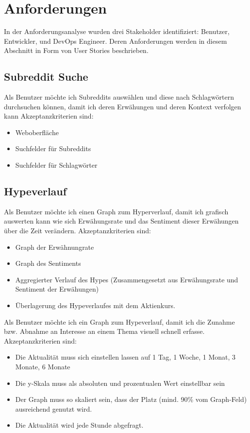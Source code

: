 \documentclass[a4paper, 10pt, conference]{ieeeconf}
\begin{document}
\section{Anforderungen} \label{s:anforderungen}

In der Anforderungsanalyse wurden drei Stakeholder identifiziert: Benutzer, Entwickler, und DevOps Engineer.  Deren Anforderungen werden in diesem Abschnitt in Form von User Stories beschrieben.

\subsection{Subreddit Suche}

Als Benutzer möchte ich Subreddits auswählen und diese nach Schlagwörtern durchsuchen können,  damit ich deren Erwähungen und deren Kontext verfolgen kann  Akzeptanzkriterien sind:
\begin{itemize}
\item Weboberfläche 
\item Suchfelder für Subreddits
\item Suchfelder für Schlagwörter
\end{itemize}

\subsection{Hypeverlauf}

Als Benutzer möchte ich einen Graph zum Hyperverlauf,  damit ich grafisch auswerten kann wie sich Erwähungsrate und das Sentiment dieser Erwähungen über die Zeit verändern.  Akzeptanzkriterien sind:
\begin{itemize}
\item Graph der Erwähnungrate
\item Graph des Sentiments
\item Aggregierter Verlauf des Hypes (Zusammengesetzt aus Erwähungsrate und Sentiment der Erwähungen)
\item Überlagerung des Hypeverlaufes mit dem Aktienkurs.
\end{itemize}

Als Benutzer möchte ich ein Graph zum Hypeverlauf, damit ich die Zunahme bzw. Abnahme an Interesse an einem Thema visuell schnell erfasse. Akzeptanzkriterien sind:
\begin{itemize}
    \item Die Aktualität muss sich einstellen lassen auf 1 Tag, 1 Woche, 1 Monat, 3 Monate, 6 Monate
    \item Die y-Skala muss als absoluten und prozentualen Wert einstellbar sein
    \item Der Graph muss so skaliert sein, dass der Platz (mind. 90\% vom Graph-Feld) ausreichend genutzt wird.
    \item Die Aktualität wird jede Stunde abgefragt.
\end{itemize}
\end{document}
